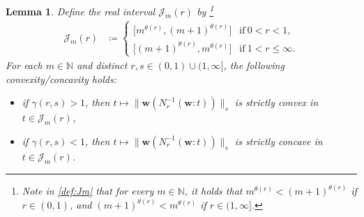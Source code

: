 \documentclass[conference, draftcls, onecolumn]{IEEEtran}
\theoremstyle{plain}
\newtheorem{lemma}{Lemma}
\newcommand{\bvec}[1]{\boldsymbol{#1}}
\begin{document}
\begin{lemma}
\label{lem:convex_w}
Define the real interval $\mathcal{J}_{m}( r )$ by%
\footnote{Note in \eqref{def:Jm} that for every $m \in \mathbb{N}$, it holds that $m^{\theta( r )} < (m+1)^{\theta( r )}$ if $r \in (0, 1)$, and $(m+1)^{\theta( r )} < m^{\theta( r )}$ if $r \in (1, \infty]$.}
\begin{align}
\mathcal{J}_{m}( r )
& \coloneqq
\begin{cases}
\big[ m^{\theta( r )}, (m+1)^{\theta( r )} \big]
& \mathrm{if} \ 0 < r < 1 ,
\\
\big[ (m+1)^{\theta( r )}, m^{\theta( r )} \big]
& \mathrm{if} \ 1 < r \le \infty .
\end{cases}
\label{def:Jm}
\end{align}
For each $m \in \mathbb{N}$ and distinct $r, s \in (0, 1) \cup (1, \infty]$, the following convexity/concavity holds:
\begin{itemize}
\item
if $\gamma( r, s ) > 1$, then $t \mapsto \| \bvec{w}( N_{r}^{-1}( \bvec{w} : t ) ) \|_{s}$ is strictly convex in $t \in \mathcal{J}_{m}( r )$,
\item
if $\gamma( r, s ) < 1$, then $t \mapsto \| \bvec{w}( N_{r}^{-1}( \bvec{w} : t ) ) \|_{s}$ is strictly concave in $t \in \mathcal{J}_{m}( r )$.
\end{itemize}
\end{lemma}
\end{document}
